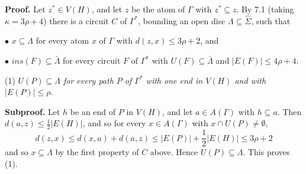 \textbf{Proof.} Let $z^* \in V(H)$, and let $z$ be the atom of $\Gamma$ with $z^* \subseteq z$. By 7.1 (taking $\kappa = 3\rho + 4$) there is a circuit $C$ of $\Gamma^*$, bounding an open disc $\Lambda \subseteq \hat{\Sigma}$, such that

\hspace*{12pt}$\bullet$ $x \subseteq \Lambda$ for every atom $x$ of $\Gamma$ with $d(z, x) \le 3\rho + 2$, and

\hspace*{12pt}$\bullet$ $ins(F) \subseteq \bar{\Lambda}$ for every circuit $F$ of $\Gamma^*$ with $U(F) \subseteq \bar{\Lambda}$ and $|E(F)| \le 4\rho + 4$.

\hspace*{12pt}(1) \textit{$U(P) \subseteq \Lambda$ for every path $P$ of $\Gamma^*$ with one end in $V(H)$ and with $|E(P)| \le \rho$.}

\textbf{Subproof.} Let $h$ be an end of $P$ in $V(H)$, and let $a \in A(\Gamma)$ with $h \subseteq a$. Then $d(a, z) \le \frac{1}{2}|E(H)|$, and so for every $x \in A(\Gamma)$ with $x \cap U(P) \ne \emptyset$,
\begin{equation*}
d(z, x) \le d(x, a) + d(a, z) \le |E(P)| + \frac{1}{2}|E(H)| \le 3\rho + 2
\end{equation*}
and so $x \subseteq \Lambda$ by the first property of $C$ above. Hence $U(P) \subseteq \Lambda$. This proves (1).
